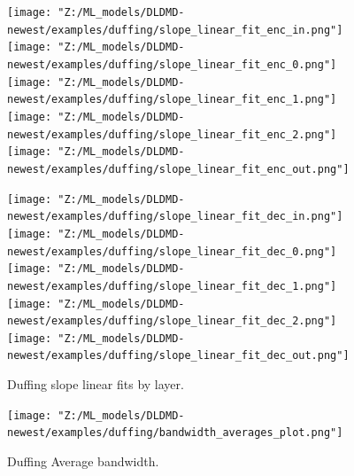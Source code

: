 \begin{figure}[p]
    \centering
    \begin{minipage}{.5\textwidth}
        \texttt{[image: "Z:/ML\_models/DLDMD-newest/examples/duffing/slope\_linear\_fit\_enc\_in.png"]} 
        \texttt{[image: "Z:/ML\_models/DLDMD-newest/examples/duffing/slope\_linear\_fit\_enc\_0.png"]} 
        \texttt{[image: "Z:/ML\_models/DLDMD-newest/examples/duffing/slope\_linear\_fit\_enc\_1.png"]} 
        \texttt{[image: "Z:/ML\_models/DLDMD-newest/examples/duffing/slope\_linear\_fit\_enc\_2.png"]} 
        \texttt{[image: "Z:/ML\_models/DLDMD-newest/examples/duffing/slope\_linear\_fit\_enc\_out.png"]} 
    \end{minipage}%
    \begin{minipage}{.5\textwidth}
        \texttt{[image: "Z:/ML\_models/DLDMD-newest/examples/duffing/slope\_linear\_fit\_dec\_in.png"]} 
        \texttt{[image: "Z:/ML\_models/DLDMD-newest/examples/duffing/slope\_linear\_fit\_dec\_0.png"]} 
        \texttt{[image: "Z:/ML\_models/DLDMD-newest/examples/duffing/slope\_linear\_fit\_dec\_1.png"]} 
        \texttt{[image: "Z:/ML\_models/DLDMD-newest/examples/duffing/slope\_linear\_fit\_dec\_2.png"]} 
        \texttt{[image: "Z:/ML\_models/DLDMD-newest/examples/duffing/slope\_linear\_fit\_dec\_out.png"]} 
    \end{minipage}
    \caption{Duffing slope linear fits by layer.}
    \label{fig:duffing slopes all layers}
\end{figure}

\begin{figure}[ht]
    \centering
    \begin{minipage}{\textwidth}
        \texttt{[image: "Z:/ML\_models/DLDMD-newest/examples/duffing/bandwidth\_averages\_plot.png"]} 
    \end{minipage} 
    \caption{Duffing Average bandwidth.}
\end{figure}

